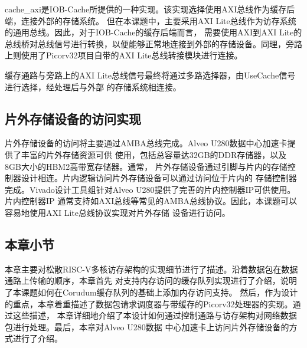 cache\_axi是IOB-Cache所提供的一种实现。该实现选择使用AXI总线作为缓存后端，连接外部的存储系统。
但在本课题中，主要采用AXI Lite总线作为访存系统的通用总线。因此，对于IOB-Cache的缓存后端而言，
需要使用AXI到AXI Lite的总线桥对总线信号进行转换，以便能够正常地连接到外部的存储设备。同理，旁路
上则使用了Picorv32项目自带的AXI Lite总线转接模块进行连接。

缓存通路与旁路上的AXI Lite总线信号最终将通过多路选择器，由UseCache信号进行选择，经处理后与外部
的存储系统相连接。

\subsection{片外存储设备的访问实现}

片外存储设备的访问将主要通过AMBA总线完成。Alveo U280数据中心加速卡提供了丰富的片外存储资源可供
使用，包括总容量达32GB的DDR存储器，以及8GB大小的HBM2高带宽存储器\cite{alveo2021datasheet}。通常，
片外存储设备通过引脚与片内的存储控制器设计相连。片内逻辑访问片外存储设备可以通过访问位于片内的
存储控制器完成。Vivado设计工具组针对Alveo U280提供了完善的片内控制器IP可供使用。片内控制器IP
通常支持如AXI总线等常见的AMBA总线协议。因此，本课题可以容易地使用AXI Lite总线协议实现对片外存储
设备进行访问。

\subsection{本章小节}

本章主要对松散RISC-V多核访存架构的实现细节进行了描述。沿着数据包在数据通路上传输的顺序，本章首先
对支持内存访问的缓存队列实现进行了介绍，说明了本课题如何在Corudum缓存队列的基础上添加内存访问支持。
然后，作为设计的重点，本章着重描述了数据包请求调度器与带缓存的Picorv32处理器的实现。通过这些描述，
本章详细地介绍了本设计如何通过控制通路与访存架构对网络数据包进行处理。最后，本章对Alveo U280数据
中心加速卡上访问片外存储设备的方式进行了介绍。
